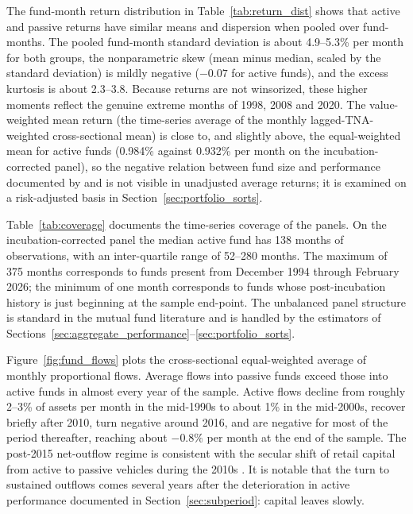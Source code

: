 \documentclass[12pt, oneside]{report}
\begin{document}




The fund-month return distribution in Table~\ref{tab:return_dist}
shows that active and passive returns have similar means and
dispersion when pooled over fund-months. The pooled fund-month standard deviation is about 4.9--5.3\%
per month for both groups, the nonparametric skew (mean minus median,
scaled by the standard deviation) is mildly negative ($-0.07$ for
active funds), and the excess kurtosis is about 2.3--3.8. Because returns are
not winsorized, these higher moments reflect the genuine
extreme months of 1998, 2008 and 2020. The value-weighted mean return
(the time-series average of the monthly lagged-TNA-weighted
cross-sectional mean) is close to, and slightly above, the equal-weighted
mean for active funds (0.984\% against 0.932\% per month on the
incubation-corrected panel), so the negative relation between fund size
and performance documented by \textcite{ChenHongHuangKubik2004} and
\textcite{PastorStambaughTaylor2015} is not visible in unadjusted average
returns; it is examined on a risk-adjusted basis in
Section~\ref{sec:portfolio_sorts}.

Table~\ref{tab:coverage} documents the time-series coverage of the
panels. On the incubation-corrected panel the median active fund has 138
months of observations, with an inter-quartile range of 52--280 months.
The maximum of 375 months corresponds to funds present from December 1994
through February 2026; the minimum of one month corresponds to funds whose
post-incubation history is just beginning at the sample end-point. The
unbalanced panel structure is standard in the mutual fund literature and
is handled by the estimators of
Sections~\ref{sec:aggregate_performance}--\ref{sec:portfolio_sorts}.



Figure~\ref{fig:fund_flows} plots the cross-sectional equal-weighted
average of monthly proportional flows. Average flows into passive funds
exceed those into active funds in almost every year of the sample. Active
flows decline from roughly 2--3\% of assets per month in the mid-1990s to
about 1\% in the mid-2000s, recover briefly after 2010, turn negative
around 2016, and are negative for most of the period thereafter, reaching about $-0.8\%$ per
month at the end of the sample. The post-2015 net-outflow regime is
consistent with the secular shift of retail capital from active to
passive vehicles during the 2010s \parencite{IndexEffect2018}. It is
notable that the turn to sustained outflows comes several years after the
deterioration in active performance documented in
Section~\ref{sec:subperiod}: capital leaves slowly.
\end{document}
